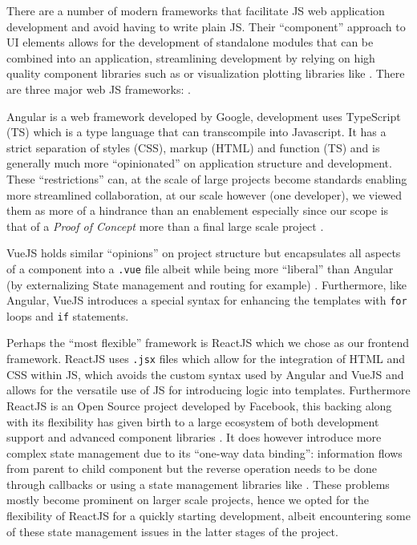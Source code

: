 \documentclass[\version]{l4proj}
\begin{document}
There are a number of modern frameworks that facilitate JS web application development and avoid having to write plain JS.
Their ``component'' approach to UI elements allows for the development of standalone modules that can be combined into an application, streamlining development by relying on high quality component libraries such as \textcite{Materialui2020} or visualization plotting libraries like \textcite{Recharts2020}.
There are three major web JS frameworks: \textcite{Angular2020,FacebookReact2020,VuejsVue2020}.

Angular is a web framework developed by Google, development uses TypeScript (TS) which is a type language that can transcompile into Javascript.
It has a strict separation of styles (CSS), markup (HTML) and function (TS) and is generally much more ``opinionated'' on application structure and development.
These ``restrictions'' can, at the scale of large projects become standards enabling more streamlined collaboration, at our scale however (one developer), we viewed them as more of a hindrance than an enablement especially since our scope is that of a \textit{Proof of Concept} more than a final large scale project \autocite{wohlgethanSupportingWebDevelopmentDecisions2018}.

VueJS holds similar ``opinions'' on project structure but encapsulates all aspects of a component into a \lstinline{.vue} file albeit while being more ``liberal'' than Angular (by externalizing State management and routing for example) \autocite{wohlgethanSupportingWebDevelopmentDecisions2018}.
Furthermore, like Angular, VueJS introduces a special syntax for enhancing the templates with \lstinline{for} loops and \lstinline{if} statements.

Perhaps the ``most flexible'' framework is ReactJS which we chose as our frontend framework.
ReactJS uses \lstinline{.jsx} files which allow for the integration of HTML and CSS within JS, which avoids the custom syntax used by Angular and VueJS and allows for the versatile use of JS for introducing logic into templates.
Furthermore ReactJS is an Open Source project developed by Facebook, this backing along with its flexibility has given birth to a large ecosystem of both development support and advanced component libraries \autocite{wohlgethanSupportingWebDevelopmentDecisions2018}.
It does however introduce more complex state management due to its ``one-way data binding'': information flows from parent to child component but the reverse operation needs to be done through callbacks or using a state management libraries like \textcite{Redux2020}.
These problems mostly become prominent on larger scale projects, hence we opted for the flexibility of ReactJS for a quickly starting development, albeit encountering some of these state management issues in the latter stages of the project.
\end{document}
